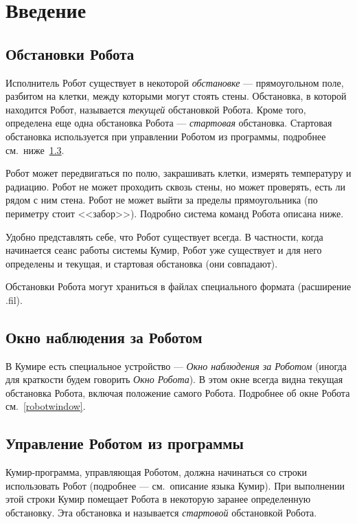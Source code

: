 \documentclass[12pt,a4paper]{article}
\begin{document}

\section{Введение}

\subsection{Обстановки Робота}
\label{robotfield}

Исполнитель Робот существует в некоторой \emph{обстановке} --- прямоугольном поле, разбитом на клетки, между которыми могут стоять стены. Обстановка, в которой находится Робот, называется \emph{текущей} обстановкой Робота. Кроме того, определена еще одна обстановка Робота --- \emph{стартовая} обстановка. Стартовая обстановка используется при управлении Роботом из программы, подробнее см.~ниже~\ref{robotmanage}.

Робот может передвигаться по полю, закрашивать клетки, измерять температуру и радиацию. Робот не может проходить сквозь стены, но может проверять, есть ли рядом с ним стена. Робот не может выйти за пределы прямоугольника (по периметру стоит <<забор>>). Подробно система команд Робота описана ниже.

Удобно представлять себе, что Робот существует всегда. В частности, когда начинается сеанс работы системы Кумир, Робот уже существует и для него определены и текущая, и стартовая обстановка (они совпадают).

Обстановки Робота могут храниться в файлах специального формата (расширение .fil).

\subsection{Окно наблюдения за Роботом}

В Кумире есть специальное устройство --- \emph{Окно наблюдения за Роботом} (иногда для краткости будем говорить \emph{Окно Робота}). В этом окне всегда видна текущая обстановка Робота, включая положение самого Робота. Подробнее об окне Робота см.~\ref{robotwindow}.

\subsection{Управление Роботом из программы}
\label{robotmanage}

Кумир-программа, управляющая Роботом, должна начинаться со строки \textsf{использовать \mbox{Робот}} (подробнее --- см.~описание языка Кумир). При выполнении этой строки Кумир помещает Робота в некоторую заранее определенную обстановку. Эта обстановка и называется \emph{стартовой} обстановкой Робота.
\end{document}
